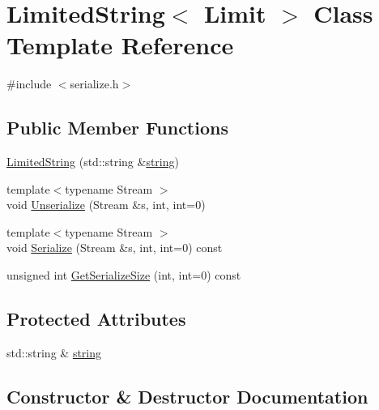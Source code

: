 \hypertarget{class_limited_string}{}\section{Limited\+String$<$ Limit $>$ Class Template Reference}
\label{class_limited_string}


{\ttfamily \#include $<$serialize.\+h$>$}

\subsection*{Public Member Functions}
\begin{DoxyCompactItemize}
\item 
\hyperlink{class_limited_string_afd9b0daa877f4d28c6b909bd34fd597d}{Limited\+String} (std\+::string \&\hyperlink{class_limited_string_a3f1d004f4632f7b2fda1a5a5afc266f7}{string})
\item 
{\footnotesize template$<$typename Stream $>$ }\\void \hyperlink{class_limited_string_a21ec9b742da8f8ff7b9a8b89131f943b}{Unserialize} (Stream \&s, int, int=0)
\item 
{\footnotesize template$<$typename Stream $>$ }\\void \hyperlink{class_limited_string_a4421821da094900bf15f79768a13e8b9}{Serialize} (Stream \&s, int, int=0) const 
\item 
unsigned int \hyperlink{class_limited_string_a9864565cf21b4f2ca09f78acc77d9563}{Get\+Serialize\+Size} (int, int=0) const 
\end{DoxyCompactItemize}
\subsection*{Protected Attributes}
\begin{DoxyCompactItemize}
\item 
std\+::string \& \hyperlink{class_limited_string_a3f1d004f4632f7b2fda1a5a5afc266f7}{string}
\end{DoxyCompactItemize}


\subsection{Constructor \& Destructor Documentation}
\hypertarget{class_limited_string_afd9b0daa877f4d28c6b909bd34fd597d}{}
